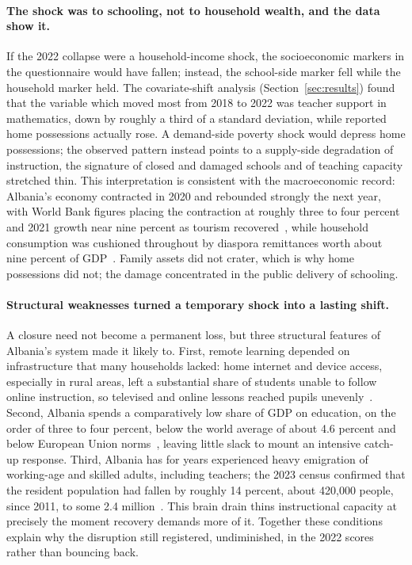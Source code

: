 \paragraph{The shock was to schooling, not to household wealth, and the data show it.}
If the 2022 collapse were a household-income shock, the socioeconomic markers in the
questionnaire would have fallen; instead, the school-side marker fell while the
household marker held. The covariate-shift analysis (Section~\ref{sec:results}) found
that the variable which moved most from 2018 to 2022 was teacher support in
mathematics, down by roughly a third of a standard deviation, while reported home
possessions actually rose. A demand-side poverty shock would depress home possessions;
the observed pattern instead points to a supply-side degradation of instruction, the
signature of closed and damaged schools and of teaching capacity stretched thin. This
interpretation is consistent with the macroeconomic record: Albania's economy
contracted in 2020 and rebounded strongly the next year, with World Bank figures
placing the contraction at roughly three to four percent and 2021 growth near nine
percent as tourism recovered~\citep{worldbank_albania}, while household consumption was
cushioned throughout by diaspora remittances worth about nine percent of
GDP~\citep{worldbank_remittances}. Family assets did not crater, which is why home
possessions did not; the damage concentrated in the public delivery of schooling.

\paragraph{Structural weaknesses turned a temporary shock into a lasting shift.}
A closure need not become a permanent loss, but three structural features of Albania's
system made it likely to. First, remote learning depended on infrastructure that many
households lacked: home internet and device access, especially in rural areas, left a
substantial share of students unable to follow online instruction, so televised and
online lessons reached pupils unevenly~\citep{worldbank_covid_learning,unicef_albania}.
Second, Albania spends a comparatively low share of GDP on education, on the order of
three to four percent, below the world average of about 4.6 percent and below European
Union norms~\citep{worldbank_edu_spending}, leaving little slack to mount an intensive
catch-up response. Third, Albania has for years experienced heavy emigration of
working-age and skilled adults, including teachers; the 2023 census confirmed that the
resident population had fallen by roughly 14 percent, about 420{,}000 people, since
2011, to some 2.4 million~\citep{instat_census2023}. This brain drain thins instructional
capacity at precisely the moment recovery demands more of it. Together these conditions
explain why the disruption still registered, undiminished, in the 2022 scores rather
than bouncing back.

